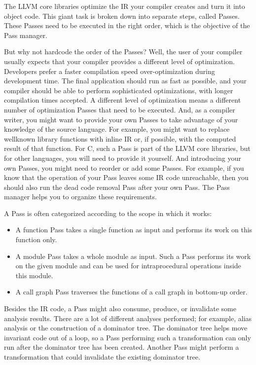 The LLVM core libraries optimize the IR your compiler creates and turn it into object code. This giant task is broken down into separate steps, called Passes. These Passes need to be executed in the right order, which is the objective of the Pass manager.\par

But why not hardcode the order of the Passes? Well, the user of your compiler usually expects that your compiler provides a different level of optimization. Developers prefer a faster compilation speed over-optimization during development time. The final application should run as fast as possible, and your compiler should be able to perform sophisticated optimizations, with longer compilation times accepted. A different level of optimization means a different number of optimization Passes that need to be executed. And, as a compiler writer, you might want to provide your own Passes to take advantage of your knowledge of the source language. For example, you might want to replace wellknown library functions with inline IR or, if possible, with the computed result of that function. For C, such a Pass is part of the LLVM core libraries, but for other languages, you will need to provide it yourself. And introducing your own Passes, you might need to reorder or add some Passes. For example, if you know that the operation of your Pass leaves some IR code unreachable, then you should also run the dead code removal Pass after your own Pass. The Pass manager helps you to organize these requirements.\par

A Pass is often categorized according to the scope in which it works:\par

\begin{itemize}
	\item A function Pass takes a single function as input and performs its work on this function only.
	\item A module Pass takes a whole module as input. Such a Pass performs its work on the 	given module and can be used for intraprocedural operations inside this module.
	\item A call graph Pass traverses the functions of a call graph in bottom-up order.
\end{itemize}

Besides the IR code, a Pass might also consume, produce, or invalidate some analysis results. There are a lot of different analyses performed; for example, alias analysis or the construction of a dominator tree. The dominator tree helps move invariant code out of a loop, so a Pass performing such a transformation can only run after the dominator tree has been created. Another Pass might perform a transformation that could invalidate the existing dominator tree.\par

